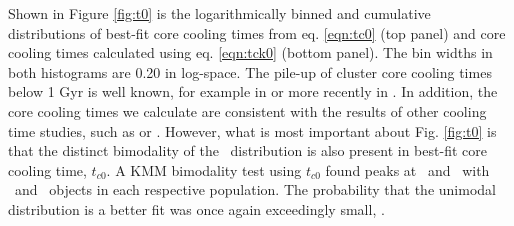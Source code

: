 Shown in Figure \ref{fig:t0} is the logarithmically binned and
cumulative distributions of best-fit core cooling times from
eq. \ref{eqn:tc0} (top panel) and core cooling times calculated using
eq. \ref{eqn:tck0} (bottom panel). The bin widths in both histograms
are 0.20 in log-space. The pile-up of cluster core cooling times below
1 Gyr is well known, for example in \citet{hu85} or more recently in
\citet{dunn08}. In addition, the core cooling times we calculate are
consistent with the results of other cooling time studies, such as
\citet{1998MNRAS.298..416P} or \citet{2008ApJ...687..899R}. However,
what is most important about Fig. \ref{fig:t0} is that the distinct
bimodality of the \kna\ distribution is also present in best-fit core
cooling time, $t_{c0}$. A KMM bimodality test using $t_{c0}$ found
peaks at \tckmma\ and \tckmmb\ with \tckmmc\ and \tckmmd\ objects in
each respective population. The probability that the unimodal
distribution is a better fit was once again exceedingly small,
\tckmme.

